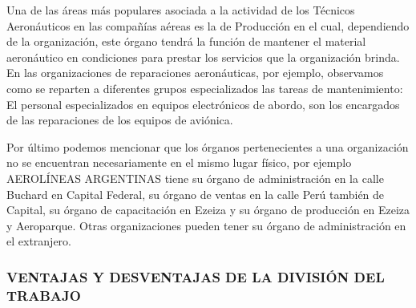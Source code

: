 \begin{center}
\begin{tabular}{|p{}|p{}|p{}|}
\end{tabular}
\end{center}


Una de las áreas más populares asociada a la actividad de los Técnicos Aeronáuticos en las compañías aéreas es la de Producción en el cual, dependiendo de la organización, este órgano tendrá la función de mantener el material aeronáutico en condiciones para prestar los servicios que la organización brinda. En las organizaciones de reparaciones aeronáuticas, por ejemplo, observamos como se reparten a diferentes grupos especializados las tareas de mantenimiento: El personal especializados en equipos electrónicos de abordo, son los encargados de las reparaciones de los equipos de aviónica.

Por último podemos mencionar que los órganos pertenecientes a una organización no se encuentran necesariamente en el mismo lugar físico, por ejemplo AEROLÍNEAS ARGENTINAS tiene su órgano de administración en la calle Buchard en Capital Federal, su órgano de ventas en la calle Perú también de Capital, su órgano de capacitación en Ezeiza y su órgano de producción en Ezeiza y Aeroparque. Otras organizaciones pueden tener su órgano de administración en el extranjero.

\subsubsection*{VENTAJAS Y DESVENTAJAS DE LA DIVISIÓN DEL TRABAJO}

